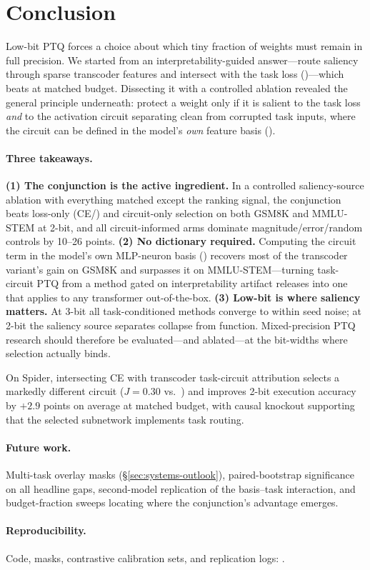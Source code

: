 \section{Conclusion}
\label{sec:conclusion}

Low-bit PTQ forces a choice about which tiny fraction of weights must remain
in full precision. We started from an interpretability-guided answer---route
saliency through sparse transcoder features and intersect with the task loss
(\method{})---which beats \baseline{} at matched budget. Dissecting it with a
controlled ablation revealed the general principle underneath: protect a
weight only if it is salient to the task loss \emph{and} to the activation
circuit separating clean from corrupted task inputs, where the circuit can be
defined in the model's \emph{own} feature basis (\methodfree{}).

\paragraph{Three takeaways.}
\textbf{(1) The conjunction is the active ingredient.} In a controlled
saliency-source ablation with everything matched except the ranking signal,
the conjunction beats loss-only (CE/\baseline{}) and circuit-only selection on
both GSM8K and MMLU-STEM at 2-bit, and all circuit-informed arms dominate
magnitude/error/random controls by 10--26 points.
\textbf{(2) No dictionary required.} Computing the circuit term in the model's
own MLP-neuron basis (\methodfree{}) recovers most of the transcoder variant's
gain on GSM8K and surpasses it on MMLU-STEM---turning task-circuit PTQ from a
method gated on interpretability artifact releases into one that applies to
any transformer out-of-the-box.
\textbf{(3) Low-bit is where saliency matters.} At 3-bit all task-conditioned
methods converge to within seed noise; at 2-bit the saliency source separates
collapse from function. Mixed-precision PTQ research should therefore be
evaluated---and ablated---at the bit-widths where selection actually binds.

On Spider, intersecting CE with transcoder task-circuit attribution selects a
markedly different circuit ($J{=}0.30$ vs.\ \baseline{}) and improves 2-bit
execution accuracy by $+2.9$ points on average at matched budget, with causal
knockout supporting that the selected subnetwork implements task routing.

\paragraph{Future work.} Multi-task overlay masks
(\S\ref{sec:systems-outlook}), paired-bootstrap significance on all headline
gaps, second-model replication of the basis--task interaction, and
budget-fraction sweeps locating where the conjunction's advantage emerges.

\paragraph{Reproducibility.} Code, masks, contrastive calibration sets, and
replication logs: .
